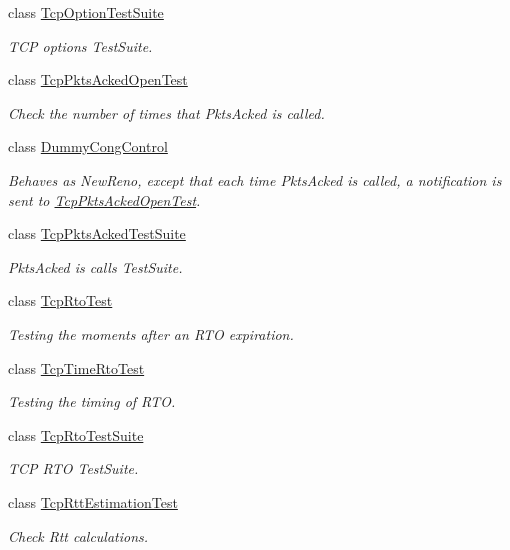 \begin{DoxyCompactItemize}
class \hyperlink{classTcpOptionTestSuite}{Tcp\+Option\+Test\+Suite}
\begin{DoxyCompactList}\small\item\em T\+CP options Test\+Suite. \end{DoxyCompactList}\item 
class \hyperlink{classTcpPktsAckedOpenTest}{Tcp\+Pkts\+Acked\+Open\+Test}
\begin{DoxyCompactList}\small\item\em Check the number of times that Pkts\+Acked is called. \end{DoxyCompactList}\item 
class \hyperlink{classDummyCongControl}{Dummy\+Cong\+Control}
\begin{DoxyCompactList}\small\item\em Behaves as New\+Reno, except that each time Pkts\+Acked is called, a notification is sent to \hyperlink{classTcpPktsAckedOpenTest}{Tcp\+Pkts\+Acked\+Open\+Test}. \end{DoxyCompactList}\item 
class \hyperlink{classTcpPktsAckedTestSuite}{Tcp\+Pkts\+Acked\+Test\+Suite}
\begin{DoxyCompactList}\small\item\em Pkts\+Acked is calls Test\+Suite. \end{DoxyCompactList}\item 
class \hyperlink{classTcpRtoTest}{Tcp\+Rto\+Test}
\begin{DoxyCompactList}\small\item\em Testing the moments after an R\+TO expiration. \end{DoxyCompactList}\item 
class \hyperlink{classTcpTimeRtoTest}{Tcp\+Time\+Rto\+Test}
\begin{DoxyCompactList}\small\item\em Testing the timing of R\+TO. \end{DoxyCompactList}\item 
class \hyperlink{classTcpRtoTestSuite}{Tcp\+Rto\+Test\+Suite}
\begin{DoxyCompactList}\small\item\em T\+CP R\+TO Test\+Suite. \end{DoxyCompactList}\item 
class \hyperlink{classTcpRttEstimationTest}{Tcp\+Rtt\+Estimation\+Test}
\begin{DoxyCompactList}\small\item\em Check Rtt calculations. \end{DoxyCompactList}\item 

\end{DoxyCompactItemize}
